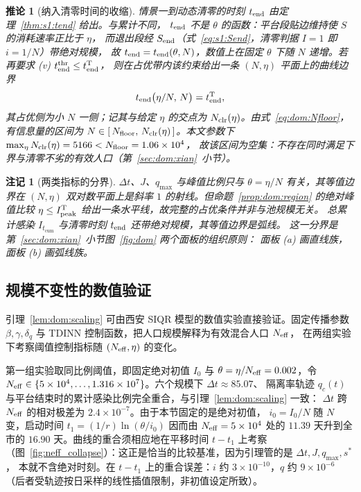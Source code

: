 \documentclass[lang=cn,a4paper,newtx]{elegantpaper}
\numberwithin{equation}{section}
\theoremstyle{plain}
\newtheorem{corollaryn}[theorem]{推论}
\newtheorem{remarkn}[theorem]{注记}
\newcommand{\Itcum}{I_{t_{\mathrm{cum}}}}
\begin{document}
\begin{corollaryn}[纳入清零时间的收缩]\label{cor:clr}
情景一到动态清零的时刻 $t_{\rm end}$ 由定理~\ref{thm:s1:tend} 给出。与累计不同，
$t_{\rm end}$ 不是 $\theta$ 的函数：平台段贴边维持使 $S$ 的消耗速率正比于 $\eta$，
而退出段经 $S_{\rm end}$（式~\eqref{eq:s1:Send}，清零判据 $I=1$ 即 $i=1/N$）带绝对规模，
故 $t_{\rm end}=t_{\rm end}(\theta,N)$，数值上在固定 $\theta$ 下随 $N$ 递增。若再要求
\emph{(v)} $t_{\rm end}^{\rm thr}\le t_{\rm end}^{\rm T}$，
则在占优带内该约束给出一条 $(N,\eta)$ 平面上的曲线边界
\begin{equation}
  t_{\rm end}\big(\eta/N,\,N\big)=t_{\rm end}^{\rm T},
  \label{eq:dom:clrarc}
\end{equation}
其占优侧为小 $N$ 一侧；记其与给定 $\eta$ 的交点为 $N_{\rm clr}(\eta)$。由式~\eqref{eq:dom:Nfloor}，
有信息量的区间为 $N\in[\,N_{\rm floor},\,N_{\rm clr}(\eta)\,]$。本文参数下
$\max_\eta N_{\rm clr}(\eta)=5166<N_{\rm floor}=1.06\times10^{4}$，
故该区间为空集：不存在同时满足下界与清零不劣的有效人口（第~\ref{sec:dom:xian}~小节）。
\end{corollaryn}

\begin{remarkn}[两类指标的分界]\label{rem:dom:dichotomy}
$\Delta t$、$J$、$q_{\max}$ 与峰值比例只与 $\theta=\eta/N$ 有关，其等值边界在 $(N,\eta)$
双对数平面上是斜率 $1$ 的射线。但命题~\ref{prop:dom:region} 的绝对峰值比较
$\eta\le I_{\rm peak}^{\rm T}$ 给出一条水平线，故完整的占优条件并非与池规模无关。
总累计感染 $\Itcum$ 与清零时刻 $t_{\rm end}$ 还带绝对规模，其等值边界是弧线。
这一分界是第~\ref{sec:dom:xian}~小节图~\ref{fig:dom} 两个面板的组织原则：
面板 (a) 画直线族，面板 (b) 画弧线族。
\end{remarkn}

\subsection{规模不变性的数值验证}
\label{sec:scaling}

引理~\ref{lem:dom:scaling} 可由西安 SIQR 模型的数值实验直接验证。固定传播参数
$\beta,\gamma,\delta_q$ 与 TDINN 控制函数，把人口规模解释为有效混合人口 $N_{\rm eff}$，
在两组实验下考察阈值控制指标随 $(N_{\rm eff},\eta)$ 的变化。

第一组实验取同比例阈值，即固定绝对初值 $I_0$ 与 $\theta=\eta/N_{\rm eff}=0.002$，令
$N_{\rm eff}\in\{5\times10^4,\dots,1.316\times10^7\}$。六个规模下 $\Delta t\approx85.07$、
隔离率轨迹 $q_c(t)$ 与平台结束时的累计感染比例完全重合，与引理~\ref{lem:dom:scaling} 一致：
$\Delta t$ 跨 $N_{\rm eff}$ 的相对极差为 $2.4\times10^{-7}$。由于本节固定的是绝对初值，
$i_0=I_0/N$ 随 $N$ 变，启动时间 $t_1=(1/r)\ln(\theta/i_0)$ 因而由 $N_{\rm eff}=5\times10^{4}$ 处的
$11.39$ 天升到全市的 $16.90$ 天。曲线的重合须相应地在平移时间 $t-t_1$ 上考察
（图~\ref{fig:neff_collapse}）：这正是恰当的比较基准，因为引理管的是 $\Delta t,J,q_{\max},s^\ast$，
本就不含绝对时刻。在 $t-t_1$ 上的重合误差：$i$ 约 $3\times10^{-10}$，$q$ 约 $9\times10^{-6}$
（后者受轨迹按日采样的线性插值限制，非初值设定所致）。
\end{document}
